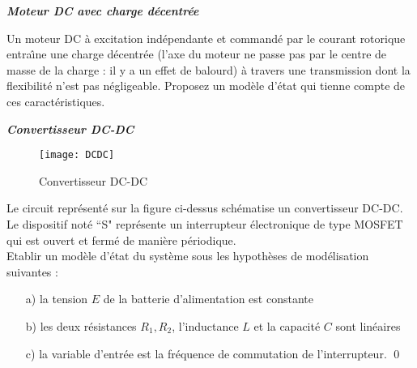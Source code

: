 \begin{exercice}{\bf \em Moteur DC avec charge décentrée}

 Un moteur DC à excitation indépendante et commandé par le
courant rotorique entra{\^\i}ne une charge décentrée (l'axe du moteur
ne passe pas par le centre de masse de la charge : il y a un effet de
balourd) à travers une transmission dont la flexibilité n'est pas
négligeable. Proposez un modèle d'état qui tienne compte de ces
caractéristiques.
\end{exercice}
\vv

\begin{exercice}{\bf \em Convertisseur DC-DC}

\begin{figure}[htbp]
\begin{center}
\texttt{[image: DCDC]}
\caption{Convertisseur DC-DC}
\label{fig:DCDC}
\end{center}
\end{figure}
Le circuit représenté sur la figure ci-dessus schématise un convertisseur
DC-DC.  Le dispositif noté ``S" représente un interrupteur
électronique de type MOSFET qui est ouvert et fermé de manière périodique.\\

Etablir un modèle d'état du système sous les hypothèses de modélisation
suivantes :
\begin{itemize}
\item[a)] la tension $E$ de la batterie d'alimentation est constante
\item[b)] les deux résistances $R_1, R_2$, l'inductance $L$ et la capacité
$C$ sont linéaires
\item[c)] la variable d'entrée est la fréquence de commutation de
l'interrupteur. \qed
\end{itemize} 
\end{exercice}



